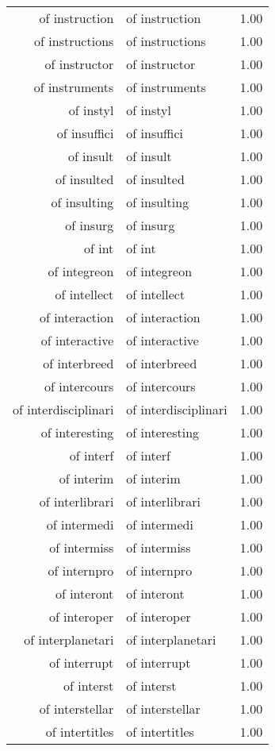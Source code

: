 \begin{table}[ht]
\begin{tabular}{rlr}
  of instruction & of instruction & 1.00 \\ 
  of instructions & of instructions & 1.00 \\ 
  of instructor & of instructor & 1.00 \\ 
  of instruments & of instruments & 1.00 \\ 
  of instyl & of instyl & 1.00 \\ 
  of insuffici & of insuffici & 1.00 \\ 
  of insult & of insult & 1.00 \\ 
  of insulted & of insulted & 1.00 \\ 
  of insulting & of insulting & 1.00 \\ 
  of insurg & of insurg & 1.00 \\ 
  of int & of int & 1.00 \\ 
  of integreon & of integreon & 1.00 \\ 
  of intellect & of intellect & 1.00 \\ 
  of interaction & of interaction & 1.00 \\ 
  of interactive & of interactive & 1.00 \\ 
  of interbreed & of interbreed & 1.00 \\ 
  of intercours & of intercours & 1.00 \\ 
  of interdisciplinari & of interdisciplinari & 1.00 \\ 
  of interesting & of interesting & 1.00 \\ 
  of interf & of interf & 1.00 \\ 
  of interim & of interim & 1.00 \\ 
  of interlibrari & of interlibrari & 1.00 \\ 
  of intermedi & of intermedi & 1.00 \\ 
  of intermiss & of intermiss & 1.00 \\ 
  of internpro & of internpro & 1.00 \\ 
  of interont & of interont & 1.00 \\ 
  of interoper & of interoper & 1.00 \\ 
  of interplanetari & of interplanetari & 1.00 \\ 
  of interrupt & of interrupt & 1.00 \\ 
  of interst & of interst & 1.00 \\ 
  of interstellar & of interstellar & 1.00 \\ 
  of intertitles & of intertitles & 1.00 \\ 

\end{tabular}
\end{table}
